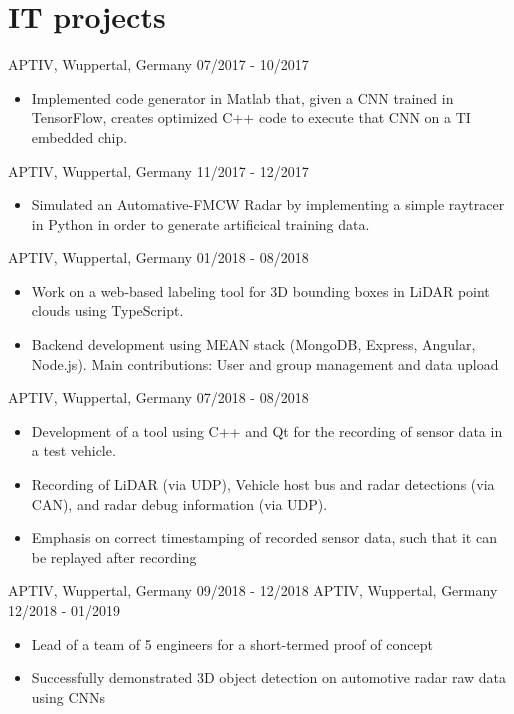 \documentclass[singlesided,
               paper=a4,
               fontsize=10pt
              ]{my-resume}
\begin{document}
\section[\faGears]{IT projects}
    {APTIV, Wuppertal, Germany}
    {07/2017 - 10/2017}
    {\begin{itemize}
        \item Implemented code generator in Matlab that, given a CNN trained in TensorFlow, creates optimized C++ code to execute that CNN on a TI embedded chip. 
    \end{itemize}}
    {APTIV, Wuppertal, Germany}
    {11/2017 - 12/2017}
    {\begin{itemize}
        \item Simulated an Automative-FMCW Radar by implementing a simple raytracer in Python in order to generate artificical training data. 
    \end{itemize}}
    {APTIV, Wuppertal, Germany}
    {01/2018 - 08/2018}
    {\begin{itemize}
        \item Work on a web-based labeling tool for 3D bounding boxes in LiDAR point clouds using TypeScript.
        \item Backend development using MEAN stack (MongoDB, Express, Angular, Node.js). Main contributions: User and group management and data upload
    \end{itemize}}
    {APTIV, Wuppertal, Germany}
    {07/2018 - 08/2018}
    {\begin{itemize}
        \item Development of a tool using C++ and Qt for the recording of sensor data in a test vehicle.
        \item Recording of LiDAR (via UDP), Vehicle host bus and radar detections (via CAN), and radar debug information (via UDP).
        \item Emphasis on correct timestamping of recorded sensor data, such that it can be replayed after recording 
    \end{itemize}}
    {APTIV, Wuppertal, Germany}
    {09/2018 - 12/2018}
    {}
    {APTIV, Wuppertal, Germany}
    {12/2018 - 01/2019}
    {\begin{itemize}
        \item Lead of a team of 5 engineers for a short-termed proof of concept
        \item Successfully demonstrated 3D object detection on automotive radar raw data using CNNs
    \end{itemize}}
\end{document}
